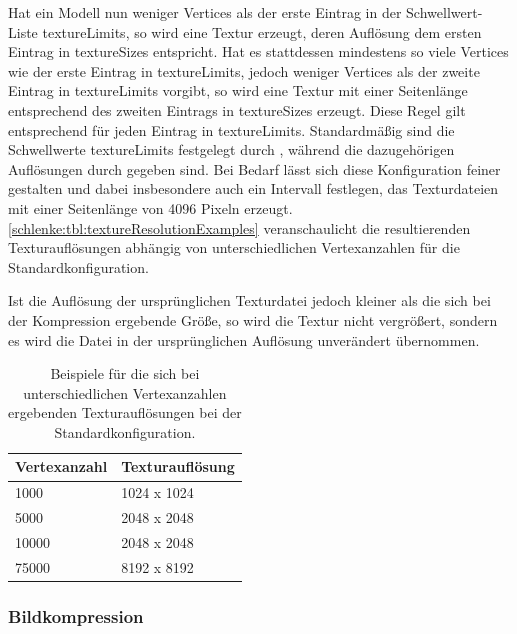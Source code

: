 Hat ein Modell nun weniger Vertices als der erste Eintrag in der Schwellwert-Liste {\ttfamily texture\-Limits}, so wird eine Textur erzeugt, deren Auflösung dem ersten Eintrag in {\ttfamily texture\-Sizes} entspricht. Hat es stattdessen mindestens so viele Vertices wie der erste Eintrag in {\ttfamily texture\-Limits}, jedoch weniger Vertices als der zweite Eintrag in {\ttfamily texture\-Limits} vorgibt, so wird eine Textur mit einer Seitenlänge entsprechend des zweiten Eintrags in {\ttfamily texture\-Sizes} erzeugt. Diese Regel gilt entsprechend für jeden Eintrag in {\ttfamily texture\-Limits}. Standardmäßig sind die Schwellwerte {\ttfamily texture\-Limits} festgelegt durch {\ttfamily [5000, 50000]}, während die dazugehörigen Auflösungen durch {\ttfamily [1024, 2048, 8192]} gegeben sind. Bei Bedarf lässt sich diese Konfiguration feiner gestalten und dabei insbesondere auch ein Intervall festlegen, das Texturdateien mit einer Seitenlänge von 4096 Pixeln erzeugt. \autoref{schlenke:tbl:textureResolutionExamples} veranschaulicht die resultierenden Texturauflösungen abhängig von unterschiedlichen Vertexanzahlen für die Standardkonfiguration. 

Ist die Auflösung der ursprünglichen Texturdatei jedoch kleiner als die sich bei der Kompression ergebende Größe, so wird die Textur nicht vergrößert, sondern es wird die Datei in der ursprünglichen Auflösung unverändert übernommen.

\begin{table}
\begin{center}
\begin{tabular}{ll}
Vertexanzahl & Texturauflösung \\
\hline
1000 & 1024 x 1024 \\
5000 & 2048 x 2048 \\
10000 & 2048 x 2048 \\
75000 & 8192 x 8192 \\
\end{tabular}
\caption{Beispiele für die sich bei unterschiedlichen Vertexanzahlen ergebenden Texturauflösungen bei der Standardkonfiguration.}
\label{schlenke:tbl:textureResolutionExamples}
\end{center}
\end{table}

\subsubsection{Bildkompression}

